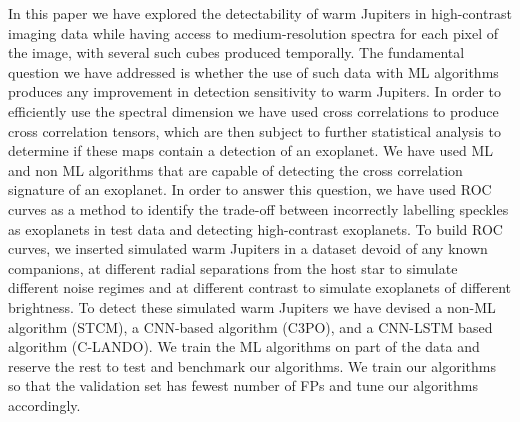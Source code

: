 \documentclass{aa}
\begin{document}
In this paper we have explored the detectability of warm Jupiters in high-contrast imaging data while having access to medium-resolution spectra for each pixel of the image, with several such cubes produced temporally.
The fundamental question we have addressed is whether the use of such data with ML algorithms produces any improvement in detection sensitivity to warm Jupiters.
In order to efficiently use the spectral dimension we have used cross correlations to produce cross correlation tensors, which are then subject to further statistical analysis to determine if these maps contain a detection of an exoplanet.
We have used ML and non ML algorithms that are capable of detecting the cross correlation signature of an exoplanet. %
In order to answer this question, we have used ROC curves as a method to identify the trade-off between incorrectly labelling speckles as exoplanets in test data and detecting high-contrast exoplanets.
To build ROC curves, we inserted simulated warm Jupiters in a dataset devoid of any known companions, at different radial separations from the host star to simulate different noise regimes and at different contrast to simulate exoplanets of different brightness.
To detect these simulated warm Jupiters we have devised a non-ML algorithm (STCM), a CNN-based algorithm (C3PO), and a CNN-LSTM based algorithm (C-LANDO). 
We train the ML algorithms on part of the data and reserve the rest to test and benchmark our algorithms. 
We train our algorithms so that the validation set has fewest number of FPs and tune our algorithms accordingly. 



\end{document}
